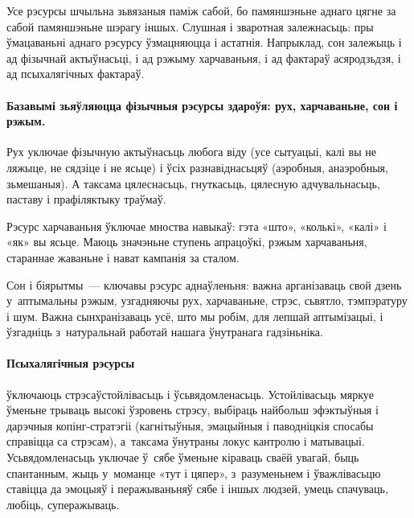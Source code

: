 Усе рэсурсы шчыльна зьвязаныя паміж сабой, бо памяншэньне аднаго цягне за сабой памяншэньне шэрагу іншых. Слушная і зваротная залежнасьць: пры ўмацаваньні аднаго рэсурсу ўзмацняюцца і астатнія. Напрыклад, сон залежыць і ад фізычнай актыўнасьці, і ад рэжыму харчаваньня, і ад фактараў асяродзьдзя, і ад псыхалягічных фактараў.


\paragraph{Базавымі зьяўляюцца фізычныя рэсурсы здароўя: рух, харчаваньне, сон і рэжым.} Рух уключае фізычную актыўнасьць любога віду (усе сытуацыі, калі вы не ляжыце, не сядзіце і не ясьце) і ўсіх разнавіднасьцяў (аэробныя, анаэробныя, зьмешаныя). А таксама цялеснасьць, гнуткасьць, цялесную адчувальнасьць, паставу і прафіляктыку траўмаў.

Рэсурс харчаваньня ўключае мноства навыкаў: гэта «што», «колькі», «калі» і «як» вы ясьце. Маюць значэньне ступень апрацоўкі, рэжым харчаваньня, стараннае жаваньне і нават кампанія за сталом.

Сон і біярытмы~--- ключавы рэсурс аднаўленьня: важна арганізаваць свой дзень у~аптымальны рэжым, узгадняючы рух, харчаваньне, стрэс, сьвятло, тэмпэратуру і шум. Важна сынхранізаваць усё, што мы робім, для лепшай аптымізацыі, і ўзгадніць з~натуральнай работай нашага ўнутранага гадзіньніка.

\paragraph{Псыхалягічныя рэсурсы} ўключаюць стрэсаўстойлівасьць і ўсьвядомленасьць. Устойлівасьць мяркуе ўменьне трываць высокі ўзровень стрэсу, выбіраць найбольш эфэктыўныя і дарэчныя копінг-стратэгіі (кагнітыўныя, эмацыйныя і паводніцкія спосабы справіцца са стрэсам), а~таксама ўнутраны локус кантролю і матывацыі. Усьвядомленасьць уключае ў~сябе ўменьне кіраваць сваёй увагай, быць спантанным, жыць у~моманце «тут і цяпер», з~разуменьнем і ўважлівасьцю ставіцца да эмоцыяў і перажываньняў сябе і іншых людзей, умець спачуваць, любіць, суперажываць.

